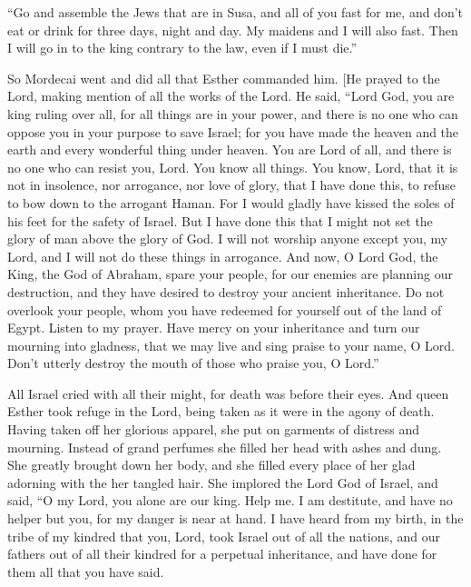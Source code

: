 {“Go and assemble the Jews that are in Susa, and all of you fast for me, and don’t eat or drink for three days, night and day. My maidens and I will also fast. Then I will go in to the king contrary to the law, even if I must die.”
\par }{\PP {}So Mordecai went and did all that Esther commanded him.
[He prayed to the Lord, making mention of all the works of the Lord.
He said, “Lord
 God, you are king ruling over all, for all things are in your power, and there is no one who can oppose you in your purpose to save Israel;
for you have made the heaven and the earth and every wonderful thing under heaven.
You are Lord of all, and there is no one who can resist you, Lord.
You know all things. You know, Lord, that it is not in insolence, nor arrogance, nor love of glory, that I have done this, to refuse to bow down to the arrogant Haman.
For I would gladly have kissed the soles of his feet for the safety of Israel.
But I have done this that I might not set the glory of man above the glory of God. I will not worship anyone except you, my Lord, and I will not do these things in arrogance.
And now, O Lord God, the King, the God of Abraham, spare your people, for our enemies are planning our destruction, and they have desired to destroy your ancient inheritance.
Do not overlook your people, whom you have redeemed for yourself out of the land of Egypt.
Listen to my prayer. Have mercy on your inheritance and turn our mourning into gladness, that we may live and sing praise to your name, O Lord. Don’t utterly destroy the mouth of those who praise you, O Lord.”
\par }{\PP {}All Israel cried with all their might, for death was before their eyes.
And queen Esther took refuge in the Lord, being taken as it were in the agony of death.
Having taken off her glorious apparel, she put on garments of distress and mourning. Instead of grand perfumes she filled her head with ashes and dung. She greatly brought down her body, and she filled every place of her glad adorning with the her tangled hair.
She implored the Lord God of Israel, and said, “O my Lord, you alone are our king. Help me. I am destitute, and have no helper but you,
for my danger is
near at hand.
I have heard from my birth, in the tribe of my kindred that you, Lord, took Israel out of all the nations, and our fathers out of all their kindred for a perpetual inheritance, and have done for them all that you have said.
}
